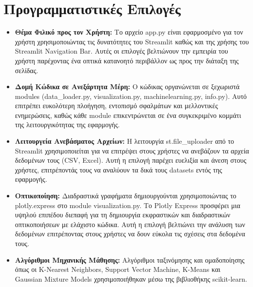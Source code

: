 \documentclass{article}
\begin{document}
\newpage

\section{Προγραμματιστικές Επιλογές}
\begin{itemize}
\item \textbf{Θέμα Φιλικό προς τον Χρήστη:} Το αρχείο app.py είναι εφαρμοσμένο για τον χρήστη χρησιμοποιώντας τις δυνατότητες του Streamlit καθώς και της χρήσης του Streamlit Navigation Bar. Αυτές οι επιλογές βελτιώνουν την εμπειρία του χρήστη παρέχοντας ένα οπτικά κατανοητό περιβάλλον ως προς την διάταξη της σελίδας.

\item \textbf{Δομή Κώδικα σε Ανεξάρτητα Μέρη:} Ο κώδικας οργανώνεται σε ξεχωριστά modules (data\_loader.py, visualization.py, machinelearning.py,    info.py). Αυτό επιτρέπει ευκολότερη πλοήγηση, εντοπισμό σφαλμάτων και μελλοντικές ενημερώσεις, καθώς κάθε module επικεντρώνεται σε ένα συγκεκριμένο κομμάτι της λειτουργικότητας της εφαρμογής.

\item \textbf{Λειτουργεία Ανεβάσματος Αρχείων:} Η λειτουργία st.file\_uploader από το Streamlit χρησιμοποιείται για να επιτρέψει στους χρήστες να ανεβάζουν τα αρχεία δεδομένων τους (CSV, Excel). Αυτή η επιλογή παρέχει ευελιξία και άνεση στους χρήστες, επιτρέποντάς τους να αναλύουν τα δικά τους datasets εντός της εφαρμογής.

\item \textbf{Οπτικοποίηση:} Διαδραστικά γραφήματα δημιουργούνται χρησιμοποιώντας το plotly.express στο module visualization.py. Το Plotly Express προσφέρει μια υψηλού επιπέδου διεπαφή για τη δημιουργία εκφραστικών και διαδραστικών οπτικοποιήσεων με ελάχιστο κώδικα. Αυτή η επιλογή βελτιώνει την ανάλυση των δεδομένων επιτρέποντας στους χρήστες να δουν εύκολα τις σχέσεις στα δεδομένα τους.

\item \textbf{Αλγόριθμοι Μηχανικής Μάθησης:} Αλγόριθμοι ταξινόμησης και ομαδοποίησης όπως οι K-Nearest Neighbors, Support Vector Machine, K-Means και Gaussian Mixture Models χρησιμοποιήθηκαν μέσω της βιβλιοθήκης scikit-learn.
\end{itemize}
\newpage
\end{document}
